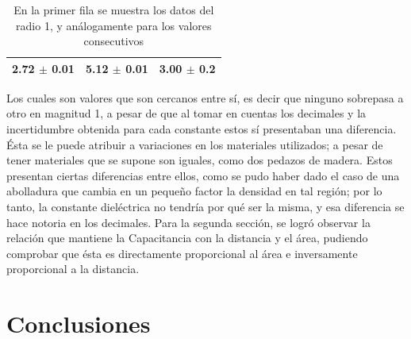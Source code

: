 \documentclass[letterpaper, 11 pt]{article}
\begin{document}
\begin{multicols}{2}
\begin{table}[H]
\begin{tabular}{|c|c|c|}
     2.72 $\pm$ 0.01   & 5.12 $\pm$ 0.01     &     3.00 $\pm$ 0.2 \\ \hline
     \end{tabular}%
   \label{tab:addlabel}%
    \caption{En la primer fila se muestra los datos del radio 1, y análogamente para los valores consecutivos }
 \end{table}%
Los cuales son valores que son cercanos entre sí, es decir que ninguno sobrepasa a otro en magnitud 1, a pesar de que al tomar en cuentas los decimales y la incertidumbre obtenida para cada constante estos sí presentaban una diferencia. Ésta se le puede atribuir a variaciones en los materiales utilizados; a pesar de tener materiales que se supone son iguales, como dos pedazos de madera. Estos presentan ciertas diferencias entre ellos, como se pudo haber dado el caso de una abolladura que cambia en un pequeño factor la densidad en tal región; por lo tanto, la constante dieléctrica no tendría por qué ser la misma, y esa diferencia se hace notoria en los decimales.
Para la segunda sección, se logró observar la relación que mantiene la Capacitancia con la distancia y el área, pudiendo comprobar que ésta es directamente proporcional al área e inversamente proporcional a la distancia.
\section{Conclusiones}


\end{multicols}
\end{document}
